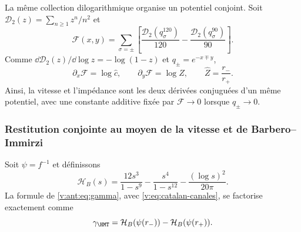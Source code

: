 La même collection dilogarithmique organise un potentiel conjoint. Soit
$\mathcal D_2(z)=\sum_{n\geq1}z^n/n^2$ et
\begin{equation}
 \mathscr F(x,y)=\sum_{\sigma=\pm}
 \left[
 \frac{\mathcal D_2(q_\sigma^{120})}{120}
 -\frac{\mathcal D_2(q_\sigma^{90})}{90}
 \right].
 \label{v:eq:potencial-constitutivo-catalan}
\end{equation}
Comme $\dd\mathcal D_2(z)/\dd\log z=-\log(1-z)$ et
$q_\pm=e^{-x\mp y}$,
\begin{equation}
 \partial_x\mathscr F=\log\widehat c,
 \qquad
 \partial_y\mathscr F=\log\widehat Z,
 \qquad \widehat Z=\frac{r_-}{r_+}.
 \label{v:eq:gradiente-constitutivo-catalan}
\end{equation}
Ainsi, la vitesse et l’impédance sont les deux dérivées conjuguées d’un même
potentiel, avec une constante additive fixée par $\mathscr F\to0$ lorsque
$q_\pm\to0$.

\subsubsection{Restitution conjointe au moyen de la vitesse et de Barbero--Immirzi}

Soit $\psi=f^{-1}$ et définissons
\begin{equation}
 \mathcal H_B(s)=\frac{12s^3}{1-s^9}
 -\frac{s^4}{1-s^{12}}-\frac{(\log s)^2}{20\pi}.
 \label{v:eq:funcional-barbero-espectral}
\end{equation}
La formule de \eqref{v:ant:eq:gamma}, avec
\eqref{v:eq:catalan-canales}, se factorise exactement comme
\begin{equation}
 \gamma_{\HMT}=\mathcal H_B(\psi(r_-))
 -\mathcal H_B(\psi(r_+)).
 \label{v:eq:factorizacion-barbero-espectral}
\end{equation}

